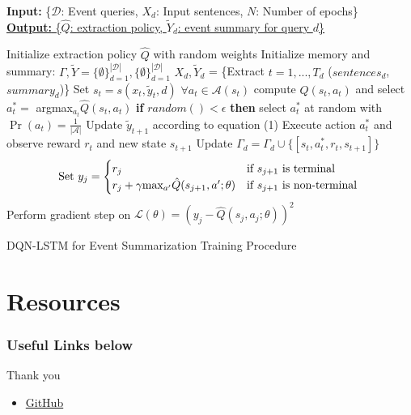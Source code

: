 \documentclass[]{beamer}
\begin{document}
\begin{frame}
\begin{algorithm}[H]
  \tiny
        \textbf{Input:} { \rm  \{$\mathcal{D}$: Event queries, $X_d$: Input sentences, $N$: Number of epochs\} } \\
        \underline{\textbf{Output:} \rm \{$\hat{Q}$: extraction policy, $\tilde{Y}_d$: event summary for query $d$\} }
\begin{algorithmic}[1]
    \STATE \rm Initialize extraction policy $\hat{Q}$ with random weights
    \STATE \rm Initialize memory and summary: $\Gamma, \tilde{Y} =  \{\emptyset \}^{\mathcal{|D|}}_{d=1},  \{\emptyset \}^{\mathcal{|D|}}_{d=1} $
            \STATE $X_{d}, \tilde{Y}_{d}$ = \{Extract $t=1,...,T_d$ ($sentences_d$, $summary_d$)\}
                \STATE Set $s_t = s(x_t, \tilde{y}_t, d)$
                \STATE $ \forall a_t \in \mathcal{A}(s_t)$ \textrm{compute} $\hat{Q}(s_t, a_t)$ and select $a^{*}_t =$ argmax$_{a_{t}}\hat{Q}(s_t, a_t)$
                \STATE  \textbf{if} $random() < \epsilon$ \textbf{then} select $a^{*}_t $ at random with $\Pr(a_t) =\frac{1}{| \mathcal{A} |} $
                \STATE Update $\tilde{y}_{t+1}$ according to equation (1)
                \STATE Execute action $a^{*}_t$ and observe reward $r_t$ and new state $s_{t+1}$
                \STATE Update $\Gamma_d = \Gamma_d \cup \{ [s_t, a^{*}_t, r_t, s_{t+1}]\}$
            \ENDFOR
        \ENDFOR
                \STATE \[\textrm{Set } y_j =
                        \begin{cases}
                            r_j                                             & \text{if $s_{j+1}$ is terminal } \\
                                r_j + \gamma $max$_{a'}\hat{Q}(s_{j+1}, a'; \theta)     & \text{if $s_{j+1}$ is non-terminal } 
                        \end{cases} 
                        \]
                        \STATE Perform gradient step on $\mathcal{L}(\theta) = (y_j - \hat{Q}(s_j, a_j; \theta))^2$
            \ENDFOR
    \ENDFOR
\end{algorithmic}
\caption*{ DQN-LSTM for Event Summarization Training Procedure}
\label{alg:seq}
\end{algorithm}
\end{frame}



\section{Resources}
\begin{frame}
	\frametitle{Useful Links below}
	Thank you
	\begin{itemize}
	\item<1-> \href{https://github.com/franciscojavierarceo/DQN-Event-Summarization}{GitHub}
	\end{itemize}
\end{frame}
\end{document}
